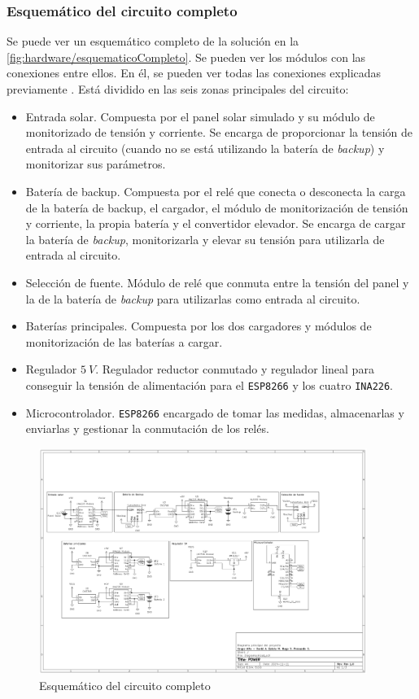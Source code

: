 \subsubsection{Esquemático del circuito completo}

Se puede ver un esquemático completo de la solución en la \autoref{fig:hardware/esquematicoCompleto}. Se pueden ver los módulos con las conexiones entre ellos. En él, se pueden ver todas las conexiones explicadas previamente . Está dividido en las seis zonas principales del circuito:
\begin{itemize}
    \item Entrada solar. Compuesta por el panel solar simulado y su módulo de monitorizado de tensión y corriente. Se encarga de proporcionar la tensión de entrada al circuito (cuando no se está utilizando la batería de \textit{backup}) y monitorizar sus parámetros.
    \item Batería de backup. Compuesta por el relé que conecta o desconecta la carga de la batería de backup, el cargador, el módulo de monitorización de tensión y corriente, la propia batería y el convertidor elevador. Se encarga de cargar la batería de \textit{backup}, monitorizarla y elevar su tensión para utilizarla de entrada al circuito.
    \item Selección de fuente. Módulo de relé que conmuta entre la tensión del panel y la de la batería de \textit{backup} para utilizarlas como entrada al circuito.
    \item Baterías principales. Compuesta por los dos cargadores y módulos de monitorización de las baterías a cargar.
    \item Regulador $5\ V$. Regulador reductor conmutado y regulador lineal para conseguir la tensión de alimentación para el \texttt{ESP8266} y los cuatro \texttt{INA226}.
    \item Microcontrolador. \texttt{ESP8266} encargado de tomar las medidas, almacenarlas y enviarlas y gestionar la conmutación de los relés.
\end{itemize}

\begin{figure}[H]
    \centering
    \includegraphics[width=0.95\textwidth]{images/2-hardware/esquematicoCircuito.png}
    \caption{Esquemático del circuito completo}
    \label{fig:hardware/esquematicoCompleto}
\end{figure}

